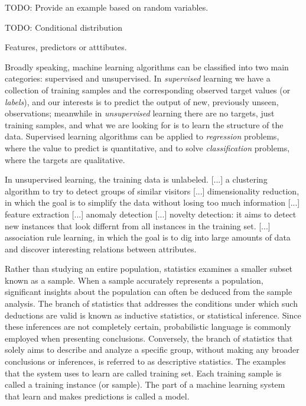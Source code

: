 \begin{example}
{\color{red} TODO: Provide an example based on random variables.}
\end{example}


{\color{red} TODO: Conditional distribution}




{\color{red} Features, predictors or atttibutes.}

Broadly speaking, machine learning algorithms can be classified into two main categories: supervised and unsupervised. In \emph{supervised} learning we have a collection of training samples and the corresponding observed target values (or \emph{labels}), and our interests is to predict the output of new, previously unseen, observations; meanwhile in \emph{unsupervised} learning there are no targets, just training samples, and what we are looking for is to learn the structure of the data. Supervised learning algorithms can be applied to \emph{regression} problems, where the value to predict is quantitative, and to solve \emph{classification} problems, where the targets are qualitative. 

{\color{red} In unsupervised learning, the training data is unlabeled. [...] a clustering algorithm to try to detect groups of similar visitors [...] dimensionality reduction, in which the goal is to simplify the data without losing too much information [...] feature extraction [...] anomaly detection [...] novelty detection: it aims to detect new instances that look differnt from all instances in the training set. [...] association rule learning, in which the goal is to dig into large amounts of data and discover interesting relations between attributes.}

Rather than studying an entire population, statistics examines a smaller subset known as a sample. When a sample accurately represents a population, significant insights about the population can often be deduced from the sample analysis. The branch of statistics that addresses the conditions under which such deductions are valid is known as inductive statistics, or statistical inference. Since these inferences are not completely certain, probabilistic language is commonly employed when presenting conclusions. Conversely, the branch of statistics that solely aims to describe and analyze a specific group, without making any broader conclusions or inferences, is referred to as descriptive statistics. {\color{red} The examples that the system uses to learn are called training set. Each training sample is called a training instance (or sample). The part of a machine learning system that learn and makes predictions is called a model.}

